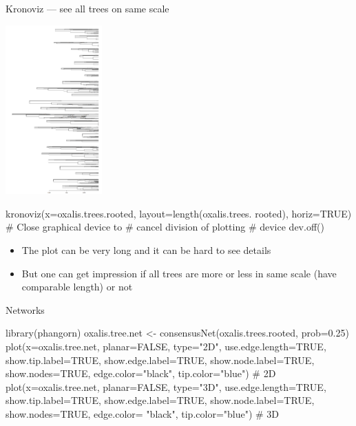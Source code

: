 \documentclass[compress, ucs, xelatex, 11pt, xcolor=svgnames, aspectratio=169,
	hyperref={
		bookmarks=true,
		unicode=true,
		colorlinks=true,
		pdftitle={Molecular data in R},
		plainpages=false,
		pdfauthor={Vojtech Zeisek},
		pdfsubject={Course about phylogeny and evolution in R},
		pdfcreator={XeLaTeX},
		pdfkeywords={R, evolution, phylogeny, molecular data},
		linkcolor=Crimson, %
		anchorcolor=Magenta, %
		citecolor=Magenta, %
		filecolor=Magenta, %
		menucolor=Magenta, %
		urlcolor=DodgerBlue, %
		pdftex},
	url={hyphens, lowtilde} %
	]{beamer}
\renewcommand{\texttt}[1]{\colorbox{Beige}{{\ttfamily #1}}}
\begin{document}
\begin{frame}[fragile]{Kronoviz --- see all trees on same scale}
	\begin{multicols}{2}
		\includegraphics[height=6.5cm]{kronoviz.png}
		\begin{spluscode}
    kronoviz(x=oxalis.trees.rooted,
      layout=length(oxalis.trees.
      rooted), horiz=TRUE)
    # Close graphical device to
    # cancel division of plotting
    # device
    dev.off()
		\end{spluscode}
		\vfill
		\begin{itemize}
			\item The plot can be very long and it can be hard to see details
			\item But one can get impression if all trees are more or less in same scale (have comparable length) or not
		\end{itemize}
		\vfil
	\end{multicols}
\end{frame}

\begin{frame}[fragile]{Networks}
	\begin{spluscode}
    library(phangorn)
    oxalis.tree.net <- consensusNet(oxalis.trees.rooted, prob=0.25)
    plot(x=oxalis.tree.net, planar=FALSE, type="2D", use.edge.length=TRUE,
      show.tip.label=TRUE, show.edge.label=TRUE, show.node.label=TRUE,
      show.nodes=TRUE, edge.color="black", tip.color="blue") # 2D
    plot(x=oxalis.tree.net, planar=FALSE, type="3D", use.edge.length=TRUE,
      show.tip.label=TRUE, show.edge.label=TRUE, show.node.label=TRUE,
      show.nodes=TRUE, edge.color= "black", tip.color="blue") # 3D
	\end{spluscode}
	\begin{center}
		\texttt{[image: oxalis-net.png]}
	\end{center}
\end{frame}
\end{document}
